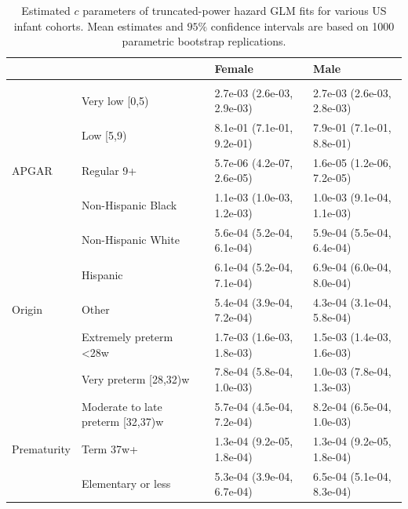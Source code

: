 \documentclass[10pt, twoside, parskip=half]{article}
\begin{document}
\begin{table}[t]

\caption{\label{tab:tab-ci-c}Estimated $c$ parameters of truncated-power hazard GLM fits for various US infant cohorts. Mean estimates and $95\%$ confidence intervals are based on 1000 parametric bootstrap replications.}
\centering
\begin{tabular}{llll}
\toprule
\textbf{} & \textbf{} & \textbf{Female} & \textbf{Male}\\
\midrule
\addlinespace[0.3em]
\multicolumn{4}{l}{\textbf{1995-1999}}\\
 & Very low [0,5) & 2.7e-03 (2.6e-03, 2.9e-03) & 2.7e-03 (2.6e-03, 2.8e-03)\\

 & Low [5,9) & 8.1e-01 (7.1e-01, 9.2e-01) & 7.9e-01 (7.1e-01, 8.8e-01)\\

\multirow{-3}{*}{\raggedright\arraybackslash \hspace{1em}APGAR} & Regular 9+ & 5.7e-06 (4.2e-07, 2.6e-05) & 1.6e-05 (1.2e-06, 7.2e-05)\\
\cmidrule{1-4}
 & Non-Hispanic Black & 1.1e-03 (1.0e-03, 1.2e-03) & 1.0e-03 (9.1e-04, 1.1e-03)\\

 & Non-Hispanic White & 5.6e-04 (5.2e-04, 6.1e-04) & 5.9e-04 (5.5e-04, 6.4e-04)\\

 & Hispanic & 6.1e-04 (5.2e-04, 7.1e-04) & 6.9e-04 (6.0e-04, 8.0e-04)\\

\multirow{-4}{*}{\raggedright\arraybackslash \hspace{1em}Origin} & Other & 5.4e-04 (3.9e-04, 7.2e-04) & 4.3e-04 (3.1e-04, 5.8e-04)\\
\cmidrule{1-4}
 & Extremely preterm <28w & 1.7e-03 (1.6e-03, 1.8e-03) & 1.5e-03 (1.4e-03, 1.6e-03)\\

 & Very preterm [28,32)w & 7.8e-04 (5.8e-04, 1.0e-03) & 1.0e-03 (7.8e-04, 1.3e-03)\\

 & Moderate to late preterm [32,37)w & 5.7e-04 (4.5e-04, 7.2e-04) & 8.2e-04 (6.5e-04, 1.0e-03)\\

\multirow{-4}{*}{\raggedright\arraybackslash \hspace{1em}Prematurity} & Term 37w+ & 1.3e-04 (9.2e-05, 1.8e-04) & 1.3e-04 (9.2e-05, 1.8e-04)\\
\cmidrule{1-4}
 & Elementary or less & 5.3e-04 (3.9e-04, 6.7e-04) & 6.5e-04 (5.1e-04, 8.3e-04)\\


\end{tabular}
\end{table}
\end{document}
